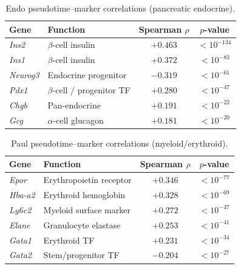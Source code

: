 \documentclass[journal]{IEEEtran}
\begin{document}
\begin{table}[!t]
    \centering
    \caption{Endo pseudotime--marker correlations (pancreatic endocrine).}
    \label{tab:endo_markers}
    \begin{tabular}{llcc}
        \toprule
        Gene & Function & Spearman $\rho$ & $p$-value \\
        \midrule
        \textit{Ins2}    & $\beta$-cell insulin        & $+0.463$ & $< 10^{-134}$ \\
        \textit{Ins1}    & $\beta$-cell insulin        & $+0.372$ & $< 10^{-83}$  \\
        \textit{Neurog3} & Endocrine progenitor        & $-0.319$ & $< 10^{-61}$  \\
        \textit{Pdx1}    & $\beta$-cell / progenitor TF & $+0.280$ & $< 10^{-47}$  \\
        \textit{Chgb}    & Pan-endocrine               & $+0.191$ & $< 10^{-22}$  \\
        \textit{Gcg}     & $\alpha$-cell glucagon      & $+0.181$ & $< 10^{-20}$  \\
        \bottomrule
    \end{tabular}
\end{table}

\begin{table}[!t]
    \centering
    \caption{Paul pseudotime--marker correlations (myeloid/erythroid).}
    \label{tab:paul_markers}
    \begin{tabular}{llcc}
        \toprule
        Gene & Function & Spearman $\rho$ & $p$-value \\
        \midrule
        \textit{Epor}   & Erythropoietin receptor  & $+0.346$ & $< 10^{-77}$ \\
        \textit{Hba-a2} & Erythroid hemoglobin     & $+0.328$ & $< 10^{-69}$ \\
        \textit{Ly6c2}  & Myeloid surface marker   & $+0.272$ & $< 10^{-47}$ \\
        \textit{Elane}  & Granulocyte elastase     & $+0.253$ & $< 10^{-41}$ \\
        \textit{Gata1}  & Erythroid TF             & $+0.231$ & $< 10^{-34}$ \\
        \textit{Gata2}  & Stem/progenitor TF       & $-0.204$ & $< 10^{-27}$ \\
        \bottomrule
    \end{tabular}
\end{table}
\end{document}
